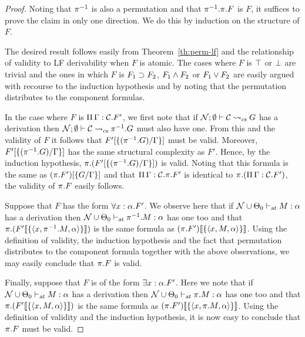 \begin{proof}
Noting that $\inv{\pi}$ is also a permutation and that
$\permute{\inv{\pi}}{\permute{\pi}{F}}$ is $F$, it suffices to prove
the claim in only one direction.
%
We do this by induction on the structure of $F$.

The desired result follows easily from
Theorem~\ref{th:perm-lf} and the relationship of validity to LF
derivability when $F$ is atomic.
%
The cases where $F$ is $\ftrue$ or $\ffalse$ are trivial and the
ones in which $F$ is $\fimp{F_1}{F_2}$, $\fand{F_1}{F_2}$ or
$\myfor{F_1}{F_2}$ are easily argued with recourse to the induction
hypothesis and by noting that the permutation distributes to the
component formulas.

In the case where $F$ is $\fctx{\Gamma}{\mathcal{C}}{F'}$, we first
note that if $\csinst{\noms}{\emptyset}{\mathcal{C}}{G}$ has a
derivation then
$\csinst{\noms}{\emptyset}{\mathcal{C}}{\permute{\inv{\pi}}{G}}$ must also
have one.
%
From this and the validity of $F$ it follows that
$\subst{\{(\permute{\inv{\pi}}{G})/\Gamma\}}{F'}$ must be valid.
%
Moreover, $\subst{\{(\permute{\inv{\pi}}{G})/\Gamma\}}{F'}$ has the same
structural complexity as $F'$.
%
Hence, by the induction hypothesis,
$\permute{\pi}{(\subst{\{\permute{(\inv{\pi}}{G})/\Gamma\}}{F'})}$ is valid.
%
Noting that this formula is the same as
$\subst{\{G/\Gamma\}}{(\permute{\pi}{F'})}$ and that
$\fctx{\Gamma}{\mathcal{C}}{\permute{\pi}{F'}}$ is identical to 
$\permute{\pi}{(\fctx{\Gamma}{\mathcal{C}}{F'})}$, the validity of
$\permute{\pi}{F}$ easily follows.

Suppose that $F$ has the form $\fall{x:\alpha}{F'}$.
%
We observe here that if
$\stlctyjudg{\noms \cup \STLCGamma_0}{M}{\alpha}$ has a derivation
then
$\stlctyjudg{\noms \cup \STLCGamma_0}{\permute{\inv{\pi}}{M}}{\alpha}$
has one too and that
$\permute{\pi}{(\hsubst{\{\langle x,\permute{\inv{\pi}}{M},\alpha\rangle\}}{F'})}$
is the same formula as
$\hsubst{\{\langle x,M,\alpha\rangle\}}{(\permute{\pi}{F'})}$.
%
Using the definition of validity, the induction hypothesis and the
fact that permutation distributes to the component formula together
with the above observations, we may easily conclude that
$\permute{\pi}{F}$ is valid.

Finally, suppose that $F$ is of the form $\fexists{x:\alpha}{F'}$.
%
Here we note that if
$\stlctyjudg{\noms \cup \STLCGamma_0}{M}{\alpha}$ has a derivation
then
$\stlctyjudg{\noms \cup \STLCGamma_0}{\permute{\pi}{M}}{\alpha}$
has one too and that
$\permute{\pi}{(\hsubst{\{\langle x, M,\alpha\rangle\}}{F'})}$
is the same formula as
$\hsubst{\{\langle
  x,\permute{\pi}{M},\alpha\rangle\}}{(\permute{\pi}{F'})}$.
%
Using the definition of validity and the induction hypothesis, it is
now easy to conclude that $\permute{\pi}{F}$ must be valid.
\end{proof}
